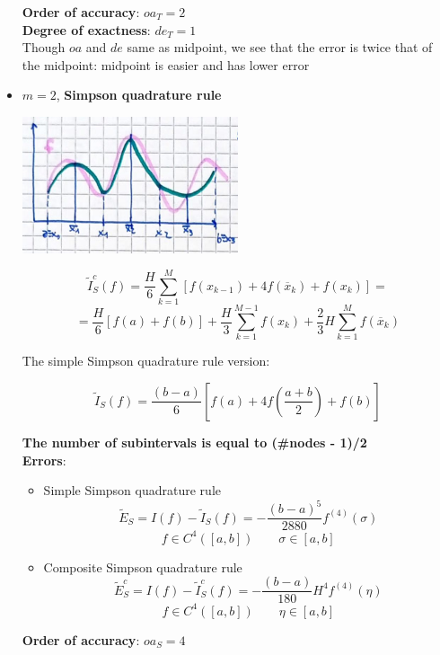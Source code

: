 \begin{itemize}
    \textbf{Order of accuracy}: $oa_{T}=2$\\
    \textbf{Degree of exactness}: $de_{T}=1$\\
    Though $oa$ and $de$ same as midpoint, we see that the error is twice that of the midpoint: midpoint is easier and has lower error
    \item $m=2$, \textbf{Simpson quadrature rule}
    \begin{center}
        \includegraphics[width=0.5\textwidth]{images/quadrature_m2.png}
    \end{center}
    \begin{LARGE}
        $$
        \tilde{I}_{S}^c(f)=
        \frac{H}{6}
        \sum_{k=1}^M
        \left[
            f(x_{k-1})+4f(\overline{x}_k)+f(x_k)
        \right]=
        $$
        $$
        =
        \frac{H}{6}
        \left[f(a)+f(b)\right]+
        \frac{H}{3}
        \sum_{k=1}^{M-1}f(x_k)+
        \frac{2}{3}H
        \sum_{k=1}^{M}f(\overline{x}_k)
        $$
    \end{LARGE}
    The simple Simpson quadrature rule version:
    \begin{LARGE}
        $$
        \tilde{I}_S(f)=\frac{(b-a)}{6}\left[
            f(a)+
            4f\left(\frac{a+b}{2}\right)+f(b)
        \right]
        $$
    \end{LARGE}
    \textbf{The number of subintervals is equal to (\#nodes - 1)/2}\\
    \textbf{Errors}:
    \begin{itemize}
        \item Simple Simpson quadrature rule
        $$
        \tilde{E}_S=I(f)-\tilde{I}_S(f)=
        -\frac{(b-a)^5}{2880}f^{(4)}(\sigma)
        $$
        $$
        f\in C^4([a,b])\qquad\sigma\in[a,b]
        $$
        \item Composite Simpson quadrature rule
        $$
        \tilde{E}_S^c=I(f)-\tilde{I}_S^c(f)=
        -\frac{(b-a)}{180}H^4f^{(4)}(\eta)
        $$
        $$
        f\in C^4([a,b])\qquad\eta\in[a,b]
        $$
    \end{itemize}
    \textbf{Order of accuracy}: $oa_{S}=4$\\

\end{itemize}
